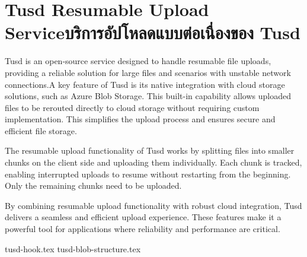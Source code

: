 \section{\ifenglish Tusd Resumable Upload Service\else บริการอัปโหลดแบบต่อเนื่องของ Tusd\fi}
Tusd is an open-source service designed to handle resumable file uploads, providing a reliable solution for large files and scenarios with unstable network connections.\enskip A key feature of Tusd is its native integration with cloud storage solutions, such as Azure Blob Storage. This built-in capability allows uploaded files to be rerouted directly to cloud storage without requiring custom implementation. This simplifies the upload process and ensures secure and efficient file storage.

The resumable upload functionality of Tusd works by splitting files into smaller chunks on the client side and uploading them individually. Each chunk is tracked, enabling interrupted uploads to resume without restarting from the beginning. Only the remaining chunks need to be uploaded.

By combining resumable upload functionality with robust cloud integration, Tusd delivers a seamless and efficient upload experience. These features make it a powerful tool for applications where reliability and performance are critical.

\newcommand{\dir}{chapters/approach/tusd}
{tusd-hook.tex}
{tusd-blob-structure.tex}